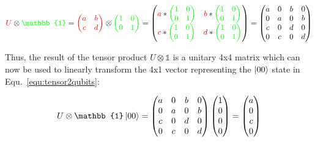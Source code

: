 \begin{equation}
\label{equ:matrixtensorproduct}
\textcolor{red}{U} \otimes \textcolor{green}{\mathbb{1}} =\textcolor{red}{\begin{pmatrix}
 a & b \\ 
 c & d
 \end{pmatrix}} \otimes \textcolor{green}{\begin{pmatrix}
 1 & 0 \\ 
 0 & 1
 \end{pmatrix}} = \begin{pmatrix}
 \textcolor{red}{a}*\textcolor{green}{\begin{pmatrix}
 1 & 0 \\ 
 0 & 1
 \end{pmatrix}} & \textcolor{red}{b}*\textcolor{green}{\begin{pmatrix}
 1 & 0 \\ 
 0 & 1
 \end{pmatrix}} \\ 
 \textcolor{red}{c}*\textcolor{green}{\begin{pmatrix}
 1 & 0 \\ 
 0 & 1
 \end{pmatrix}} & \textcolor{red}{d}*\textcolor{green}{\begin{pmatrix}
 1 & 0 \\ 
 0 & 1
 \end{pmatrix}}
 \end{pmatrix} = \begin{pmatrix}
 a & 0 & b & 0 \\ 
 0 & a & 0 & b \\ 
 c & 0 & d & 0 \\ 
 0 & c & 0 & d 
 \end{pmatrix}
\end{equation}

Thus, the result of the tensor product $U \otimes \mathbb{1}$ is a unitary 4x4 matrix which can now be used to linearly transform the 4x1 vector representing the $\ket{00}$ state in Equ.~\ref{equ:tensor2qubits}:

\begin{equation}
\label{equ:2qubitlineartransform1}
U \otimes \mathbb{1} \ket{00} = \begin{pmatrix}
 a & 0 & b & 0 \\ 
 0 & a & 0 & b \\ 
 c & 0 & d & 0 \\ 
 0 & c & 0 & d 
 \end{pmatrix} \colvec{1\\0\\0\\0} = \colvec{a\\0\\c\\0}
\end{equation}


